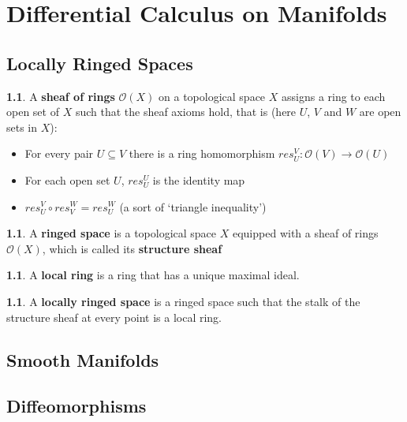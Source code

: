 \documentclass[oneside,english]{amsbook}
\numberwithin{section}{chapter}
\theoremstyle{plain}
\theoremstyle{definition}
\newtheorem{defn}[thm]{\protect\definitionname}
\providecommand{\definitionname}{Definition}
\begin{document}
	\chapter{Differential Calculus on Manifolds}
	
		\section{Locally Ringed Spaces}

			\begin{defn} 
				A \textbf{sheaf of rings} $\mathscr{O}(X)$ on a topological space $X$ assigns a ring to each open set of $X$ such that the sheaf axioms hold, that is (here $U$, $V$ and $W$ are open sets in $X$):
				\begin{itemize}
					\item For every pair $U\subseteq V$ there is a ring homomorphism $res_U^V: \mathscr{O}(V)\to \mathscr{O}(U)$
					\item For each open set $U$, $res_U^U$ is the identity map
					\item $res_U^V \circ res_V^W = res_U^W$ (a sort of `triangle inequality')
				\end{itemize}
			\end{defn}
			
			\begin{defn} 
				A \textbf{ringed space} is a topological space $X$ equipped with a sheaf of rings $\mathscr{O}(X)$, which is called its \textbf{structure sheaf}
			\end{defn}
			
			\begin{defn} 
				A \textbf{local ring} is a ring that has a unique maximal ideal.
			\end{defn}
			
			\begin{defn} 
				A \textbf{locally ringed space} is a ringed space such that the stalk of the structure sheaf at every point is a local ring.
			\end{defn}

		\section{Smooth Manifolds}

		\section{Diffeomorphisms}
\end{document}
